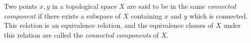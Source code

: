 \documentclass[12pt]{article}
\begin{document}
Two points $x,y$ in a topological space $X$ are said to be in the same {\em connected component} if there exists a subspace of $X$ containing $x$ and $y$ which is connected. This relation is an equivalence relation, and the equivalence classes of $X$ under this relation are called the {\em connected components} of $X$.
\end{document}
